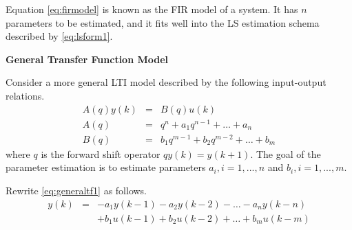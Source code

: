 Equation \eqref{eq:firmodel} is known as the FIR model of a system. It has $n$ parameters to be estimated, and it fits well into the LS estimation schema described by \eqref{eq:lsform1}.

\vspace{0.1in}
\noindent \textbf{General Transfer Function Model}
\vspace{0.1in}

Consider a more general LTI model described by the following input-output relations.
\begin{eqnarray}
  A(q)y(k) &=& B(q)u(k) \label{eq:generaltf1} \\
  A(q) &=& q^n + a_1q^{n-1} + \ldots + a_n \nonumber \\
  B(q) &=& b_1q^{m-1} + b_2q^{m-2} + \ldots + b_m \nonumber
\end{eqnarray}
where $q$ is the forward shift operator $qy(k) = y(k+1)$. The goal of the parameter estimation is to estimate parameters $a_i, i=1,...,n$ and $b_i, i=1,...,m$.

Rewrite \eqref{eq:generaltf1} as follows.
\begin{eqnarray}
  y(k) &=& - a_1y(k-1) - a_2y(k-2) - \ldots - a_ny(k-n) \nonumber \\ && + b_1u(k-1) + b_2u(k-2) + \ldots + b_mu(k-m) \nonumber
\end{eqnarray}










